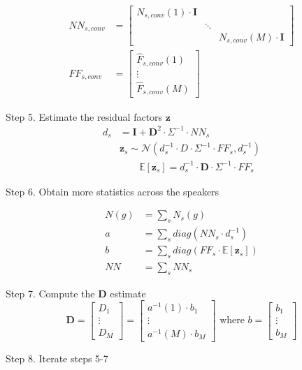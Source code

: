 \begin{align*}
    NN_{s,conv} &= \begin{bmatrix} N_{s,conv}(1) \cdot \bm{I} & & \\ & \ddots & \\ & & N_{s,conv}(M) \cdot \bm{I}  \end{bmatrix} \\
    FF_{s,conv} &= \begin{bmatrix} \hat{F}_{s,conv}(1) \\ \vdots \\ \hat{F}_{s,conv}(M) \end{bmatrix}
\end{align*}

Step 5. Estimate the residual factors $\bm{z}$
\begin{align*}
    d_s &= \bm{I} + \bm{D}^2 \cdot \Sigma^{-1} \cdot NN_s \\
    &\bm{z}_s \sim \mathcal{N}(d^{-1}_s \cdot D \cdot \Sigma^{-1} \cdot FF_s , d^{-1}_s) \\
    &\quad \quad \mathbb{E}[\bm{z}_s] = d^{-1}_s \cdot \bm{D} \cdot \Sigma^{-1} \cdot FF_s
\end{align*}

Step 6. Obtain more statistics across the speakers

\begin{align*}
    N(g) &= \sum_s N_s (g) \\
    a &= \sum_s diag(NN_s \cdot d^{-1}_s) \\
    b &= \sum_s diag(FF_s \cdot \mathbb{E}[\bm{z}_s]) \\
    NN &= \sum_s NN_s
\end{align*}

Step 7. Compute the $\bm{D}$ estimate
$$\bm{D} = \begin{bmatrix} D_1 \\ \vdots \\ D_M \end{bmatrix} = \begin{bmatrix} a^{-1}(1) \cdot b_1 \\ \vdots \\  a^{-1}(M) \cdot b_M  \end{bmatrix} \text{ where } b = \begin{bmatrix} b_1 \\ \vdots \\ b_M\end{bmatrix}$$

Step 8. Iterate steps 5-7

